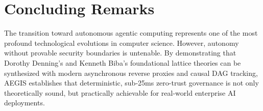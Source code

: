 \section{Concluding Remarks}
The transition toward autonomous agentic computing represents one of the most profound technological evolutions in computer science. However, autonomy without provable security boundaries is untenable. By demonstrating that Dorothy Denning's and Kenneth Biba's foundational lattice theories can be synthesized with modern asynchronous reverse proxies and causal DAG tracking, AEGIS establishes that deterministic, sub-25ms zero-trust governance is not only theoretically sound, but practically achievable for real-world enterprise AI deployments.
